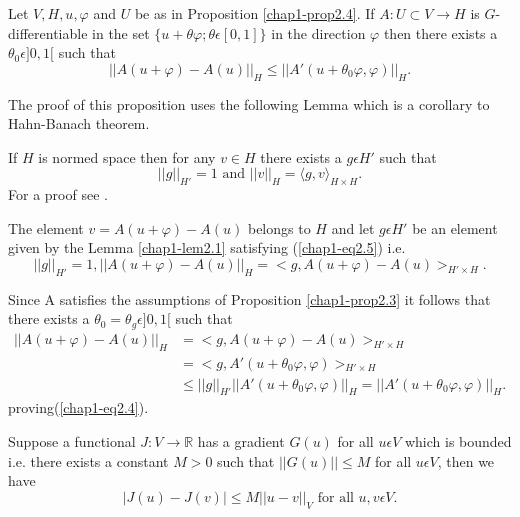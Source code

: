 \begin{proposition}\label{chap1-prop2.4}
Let $V, H, u, \varphi$ and $U$ be as in Proposition \ref{chap1-prop2.4}. If $A : U \subset V \to H$ is $G$-differentiable in the set $\{u + \theta \varphi; \theta \epsilon [0, 1]\}$ in the direction $\varphi$ then there exists a $\theta_{0} \epsilon ]0, 1[$ such that
\begin{equation*}
||A(u + \varphi) - A(u)||_{H} \leq ||A'(u + \theta_{0} \varphi, \varphi)||_{H}.\tag{2.4}\label{chap1-eq2.4}
\end{equation*}
\end{proposition}

The proof of this proposition uses the following Lemma which is a corollary to Hahn-Banach theorem.

\begin{lemma}\label{chap1-lem2.1}
If $H$ is normed space then for any $v \in H$ there exists a $g \epsilon H'$ such that
\begin{equation*}
||g||_{H'} = 1 \text{ and } ||v||_{H} = \langle g, v \rangle_{H \times H}.\tag{2.5}\label{chap1-eq2.5}
\end{equation*}
For a proof see \cite{key34}.
\end{lemma}

\medskip
{}
The element $v = A(u + \varphi) - A(u)$ belongs to $H$ and let $g \epsilon H'$ be an element given by the Lemma \ref{chap1-lem2.1} satisfying (\ref{chap1-eq2.5}) i.e.
$$
||g||_{H'} = 1, ||A(u + \varphi) - A(u)||_{H} = <g, A(u + \varphi) - A(u)>_{H' \times H}.
$$

Since A satisfies the assumptions of Proposition \ref{chap1-prop2.3}
it follows that there exists a $\theta_{0} = \theta_{g} \epsilon ]0,
  1[$ such that 
\begin{align*}
||A(u + \varphi) - A(u)||_{H} & = <g, A(u + \varphi) - A(u)>_{H'
  \times H}\\
& = <g, A'(u + \theta_{0} \varphi, \varphi)>_{H' \times H}\\
& \leq ||g||_{H'} ||A'(u + \theta_{0} \varphi, \varphi)||_{H} = ||A'(u + \theta_{0} \varphi, \varphi)||_{H}.
\end{align*}
proving\pageoriginale (\ref{chap1-eq2.4}).

\begin{proposition}\label{chap1-prop2.5}
Suppose a functional $J : V \to \mathbb{R}$ has a gradient $G(u)$ for  all $u \epsilon V$ which is bounded i.e. there exists a constant $M > 0$ such that $||G(u)|| \leq M$ for all $u \epsilon V$, then we have
\begin{equation*}
|J(u) - J(v)| \leq M||u - v||_{V} \text{ for all } u, v \epsilon V.\tag{2.6}\label{chap1-eq2.6}
\end{equation*}
\end{proposition}

